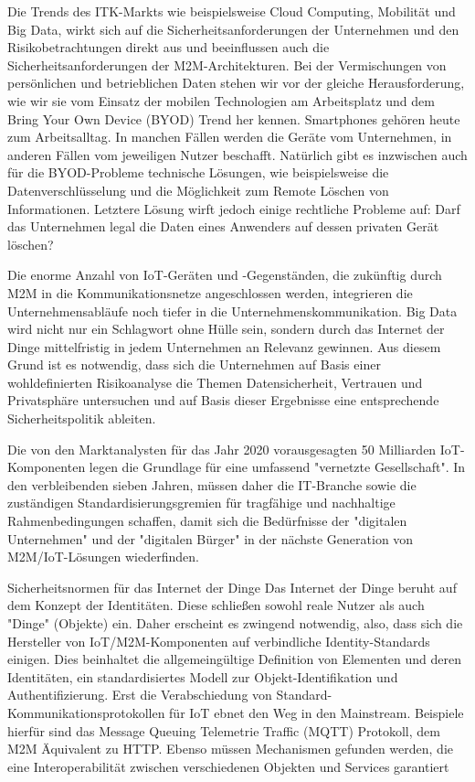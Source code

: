 Die Trends des ITK-Markts wie beispielsweise Cloud Computing, Mobilität und Big Data, wirkt sich auf die Sicherheitsanforderungen der Unternehmen und den Risikobetrachtungen direkt aus und beeinflussen auch die Sicherheitsanforderungen der M2M-Architekturen. Bei der Vermischungen von persönlichen und betrieblichen Daten stehen wir vor der gleiche Herausforderung, wie wir sie vom Einsatz der mobilen Technologien am Arbeitsplatz und dem Bring Your Own Device (BYOD) Trend her kennen. Smartphones gehören heute zum Arbeitsalltag. In manchen Fällen werden die Geräte vom Unternehmen, in anderen Fällen vom jeweiligen Nutzer beschafft. Natürlich gibt es inzwischen auch für die BYOD-Probleme technische Lösungen, wie beispielsweise die Datenverschlüsselung und die Möglichkeit zum Remote Löschen von Informationen. Letztere Lösung wirft jedoch einige rechtliche Probleme auf: Darf das Unternehmen legal die Daten eines Anwenders auf dessen privaten Gerät löschen?

Die enorme Anzahl von IoT-Geräten und -Gegenständen, die zukünftig durch M2M in die Kommunikationsnetze angeschlossen werden, integrieren die Unternehmensabläufe noch tiefer in die Unternehmenskommunikation. Big Data wird nicht nur ein Schlagwort ohne Hülle sein, sondern durch das Internet der Dinge mittelfristig in jedem Unternehmen an Relevanz gewinnen. Aus diesem Grund ist es notwendig, dass sich die Unternehmen auf Basis einer wohldefinierten Risikoanalyse die Themen Datensicherheit, Vertrauen und Privatsphäre untersuchen und auf Basis dieser Ergebnisse eine entsprechende Sicherheitspolitik ableiten.

Die von den Marktanalysten für das Jahr 2020 vorausgesagten 50 Milliarden IoT-Komponenten legen die Grundlage für eine umfassend "vernetzte Gesellschaft". In den verbleibenden sieben Jahren, müssen daher die  IT-Branche sowie die zuständigen Standardisierungsgremien für tragfähige und nachhaltige Rahmenbedingungen schaffen, damit sich die Bedürfnisse der "digitalen Unternehmen" und der "digitalen Bürger" in der nächste Generation von M2M/IoT-Lösungen wiederfinden.

Sicherheitsnormen für das Internet der Dinge
Das Internet der Dinge beruht auf dem Konzept der Identitäten. Diese schließen sowohl reale Nutzer als auch "Dinge" (Objekte) ein. Daher erscheint es zwingend notwendig, also, dass sich die Hersteller von IoT/M2M-Komponenten auf verbindliche Identity-Standards einigen. Dies beinhaltet die allgemeingültige Definition von Elementen und deren Identitäten, ein standardisiertes Modell zur Objekt-Identifikation und Authentifizierung. Erst die Verabschiedung von Standard-Kommunikationsprotokollen für IoT ebnet den Weg in den Mainstream. Beispiele hierfür sind das Message Queuing Telemetrie Traffic (MQTT) Protokoll, dem M2M Äquivalent zu HTTP. Ebenso müssen Mechanismen gefunden werden, die eine Interoperabilität zwischen verschiedenen Objekten und Services garantiert

